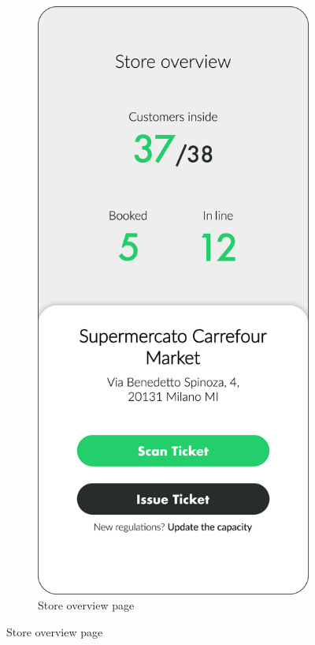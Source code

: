 \begin{figure}[H]
    \centering
    \begin{subfigure}[t]{0.28\textwidth} 
        \includegraphics{../mockups/store_overview}
        \caption*{Store overview page}

\end{subfigure}
\end{figure}

